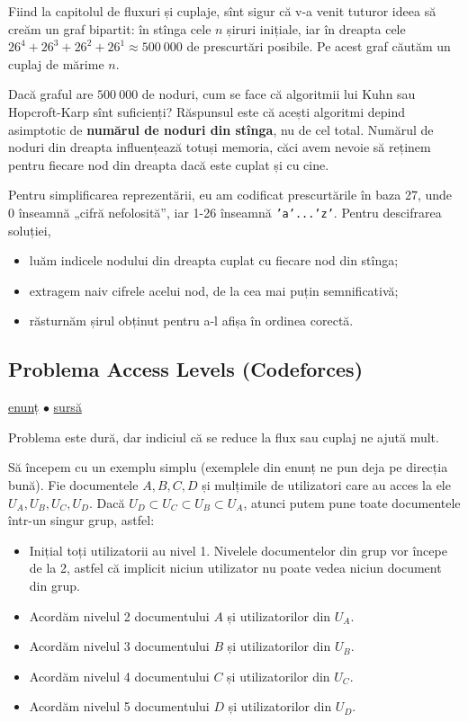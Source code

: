 \documentclass[../main.tex]{subfiles}
\begin{document}
Fiind la capitolul de fluxuri și cuplaje, sînt sigur că v-a venit tuturor ideea să creăm un graf bipartit: în stînga cele $n$ șiruri inițiale, iar în dreapta cele $26^4 + 26^3 + 26^2 + 26^1 \approx 500\ 000$ de prescurtări posibile. Pe acest graf căutăm un cuplaj de mărime $n$.

Dacă graful are $500\ 000$ de noduri, cum se face că algoritmii lui Kuhn sau Hopcroft-Karp sînt suficienți? Răspunsul este că acești algoritmi depind asimptotic de \textbf{numărul de noduri din stînga}, nu de cel total. Numărul de noduri din dreapta influențează totuși memoria, căci avem nevoie să reținem pentru fiecare nod din dreapta dacă este cuplat și cu cine.

Pentru simplificarea reprezentării, eu am codificat prescurtările în baza 27, unde 0 înseamnă „cifră nefolosită”, iar 1-26 înseamnă \texttt{'a'...'z'}. Pentru descifrarea soluției,

\begin{itemize}
  \item luăm indicele nodului din dreapta cuplat cu fiecare nod din stînga;
  \item extragem naiv cifrele acelui nod, de la cea mai puțin semnificativă;
  \item răsturnăm șirul obținut pentru a-l afișa în ordinea corectă.
\end{itemize}


\subsection{Problema Access Levels (Codeforces)}
\label{problem:access-levels}

\href{https://codeforces.com/contest/1765/problem/A}{enunț}
$\bullet$
\hyperref[code:access-levels]{sursă}

Problema este dură, dar indiciul că se reduce la flux sau cuplaj ne ajută mult.

Să începem cu un exemplu simplu (exemplele din enunț ne pun deja pe direcția bună). Fie documentele $A, B, C, D$ și mulțimile de utilizatori care au acces la ele $U_A, U_B, U_C, U_D$. Dacă $U_D \subset U_C \subset U_B \subset U_A$, atunci putem pune toate documentele într-un singur grup, astfel:

\begin{itemize}
  \item Inițial toți utilizatorii au nivel 1. Nivelele documentelor din grup vor începe de la 2, astfel că implicit niciun utilizator nu poate vedea niciun document din grup.

  \item Acordăm nivelul 2 documentului $A$ și utilizatorilor din $U_A$.

  \item Acordăm nivelul 3 documentului $B$ și utilizatorilor din $U_B$.

  \item Acordăm nivelul 4 documentului $C$ și utilizatorilor din $U_C$.

  \item Acordăm nivelul 5 documentului $D$ și utilizatorilor din $U_D$.
\end{itemize}
\end{document}
